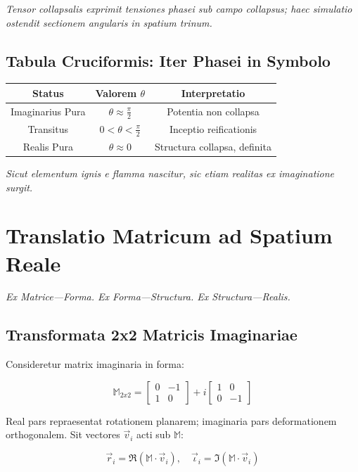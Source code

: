 \textit{Tensor collapsalis exprimit tensiones phasei sub campo collapsus; haec simulatio ostendit sectionem angularis in spatium trinum.}


\subsection*{Tabula Cruciformis: Iter Phasei in Symbolo}

\begin{center}
\begin{tabular}{|c|c|c|}
\hline
\textbf{Status} & \textbf{Valorem $\theta$} & \textbf{Interpretatio} \\
\hline
Imaginarius Pura & $\theta \approx \frac{\pi}{2}$ & Potentia non collapsa \\
\hline
Transitus & $0 < \theta < \frac{\pi}{2}$ & Inceptio reificationis \\
\hline
Realis Pura & $\theta \approx 0$ & Structura collapsa, definita \\
\hline
\end{tabular}
\end{center}

\textit{Sicut elementum ignis e flamma nascitur, sic etiam realitas ex imaginatione surgit.}

\section*{Translatio Matricum ad Spatium Reale}

\textit{Ex Matrice—Forma. Ex Forma—Structura. Ex Structura—Realis.}

\subsection*{Transformata 2x2 Matricis Imaginariae}

Consideretur matrix imaginaria in forma:

\[
\mathbb{M}_{2x2} = \begin{bmatrix}
0 & -1 \\
1 & 0
\end{bmatrix} + i \begin{bmatrix}
1 & 0 \\
0 & -1
\end{bmatrix}
\]

Real pars repraesentat rotationem planarem; imaginaria pars deformationem orthogonalem. Sit vectores $\vec{v}_i$ acti sub $\mathbb{M}$:

\[
\vec{r}_i = \Re\left( \mathbb{M} \cdot \vec{v}_i \right), \quad \vec{\iota}_i = \Im\left( \mathbb{M} \cdot \vec{v}_i \right)
\]

